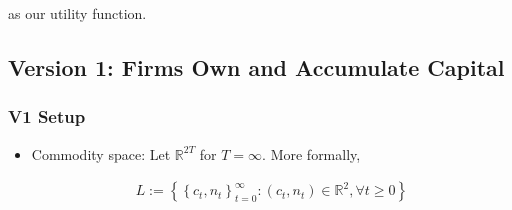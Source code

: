 \documentclass[10pt]{article}
\begin{document}
as our utility function.

\subsection{Version 1: Firms Own and Accumulate Capital}

\subsubsection{V1 Setup}

\begin{itemize}
    \item Commodity space: Let $\mathbb{R}^{2 T}$ for $T=\infty$. More formally,

        \begin{align}
            L:=\left\{\left\{c_t, n_t\right\}_{t=0}^{\infty}:\left(c_t, n_t\right) \in \mathbb{R}^2, \forall t \geq 0\right\}
        \end{align}
        

\end{itemize}
\end{document}
